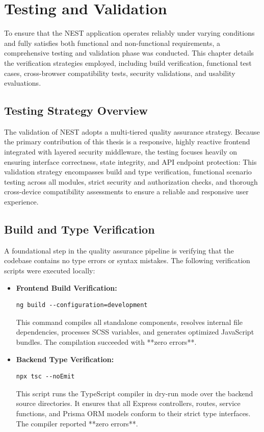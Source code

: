 \chapter{Testing and Validation}
\label{chap:testing-validation}

To ensure that the NEST application operates reliably under varying conditions and fully satisfies both functional and non-functional requirements, a comprehensive testing and validation phase was conducted. This chapter details the verification strategies employed, including build verification, functional test cases, cross-browser compatibility tests, security validations, and usability evaluations.

\section{Testing Strategy Overview}
The validation of NEST adopts a multi-tiered quality assurance strategy. Because the primary contribution of this thesis is a responsive, highly reactive frontend integrated with layered security middleware, the testing focuses heavily on ensuring interface correctness, state integrity, and API endpoint protection:
This validation strategy encompasses build and type verification, functional scenario testing across all modules, strict security and authorization checks, and thorough cross-device compatibility assessments to ensure a reliable and responsive user experience.

\section{Build and Type Verification}
A foundational step in the quality assurance pipeline is verifying that the codebase contains no type errors or syntax mistakes. The following verification scripts were executed locally:
\begin{itemize}
    \item \textbf{Frontend Build Verification:}
    \begin{lstlisting}
ng build --configuration=development
    \end{lstlisting}
    This command compiles all standalone components, resolves internal file dependencies, processes SCSS variables, and generates optimized JavaScript bundles. The compilation succeeded with **zero errors**.
    
    \item \textbf{Backend Type Verification:}
    \begin{lstlisting}
npx tsc --noEmit
    \end{lstlisting}
    This script runs the TypeScript compiler in dry-run mode over the backend source directories. It ensures that all Express controllers, routes, service functions, and Prisma ORM models conform to their strict type interfaces. The compiler reported **zero errors**.
\end{itemize}

